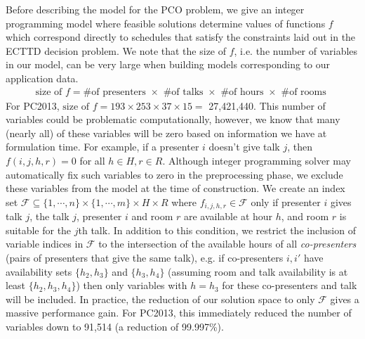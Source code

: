 \documentclass{svjour3}                     %
\begin{document}
Before describing the model for the PCO problem, we give an integer programming model where feasible solutions determine values of functions $f$ which correspond directly to schedules that satisfy the constraints laid out in the ECTTD decision problem.
We note that the size of $f$, i.e. the number of variables in our model, can be very large when building models corresponding to our application data.
\begin{gather*}
	\text{size of } f = \text{\# of presenters } \times \text{ \# of talks } \times \text{ \# of hours } \times \text{ \# of rooms }
\end{gather*}
For PC2013, $\text{size of } f = 193 \times 253 \times 37 \times 15 = $ 27,421,440. 
This number of variables could be problematic computationally, however, we know that many (nearly all) of these variables will be zero based on information we have at formulation time. 
For example, if a presenter $i$ doesn't give talk $j$, then $f(i,j,h,r) = 0$ for all $h \in H, r \in R$. 
Although integer programming solver may automatically fix such variables to zero in the preprocessing phase, we exclude these variables from the model at the time of construction.
We create an index set  $\mathcal F \subseteq \{1,\cdots,n\} \times \{1,\cdots,m\} \times H \times R$ where $f_{i,j,h,r} \in \mathcal F $ only if presenter $i$ gives talk $j$, the talk $j$, presenter $i$ and room $r$ are available at hour $h$, and room $r$ is suitable for the $j$th talk. 
In addition to this condition, we restrict the inclusion of variable indices in $\mathcal F$ to the intersection of the available hours of all \emph{co-presenters} (pairs of presenters that give the same talk), e.g. if co-presenters $i,i'$ have availability sets $\{h_2,h_3\}$ and $\{h_3,h_4\}$ (assuming room and talk availability is at least $\{h_2, h_3, h_4\}$) then only variables with $h=h_3$ for these co-presenters and talk will be included. 
In practice, the reduction of our solution space to only $\mathcal F$ gives a massive performance gain. 
For PC2013, this immediately reduced the number of variables down to 91,514 (a reduction of 99.997\%).
\end{document}
